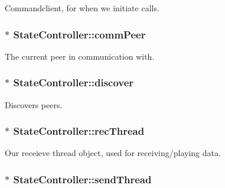\-Commandclient, for when we initiate calls. 

\hypertarget{class_state_controller_af5bd2961c916c50a04fdeaf9de4cc372}{
\subsubsection[{comm\-Peer}]{$\ast$ {\bf \-State\-Controller\-::comm\-Peer}}}
\label{class_state_controller_af5bd2961c916c50a04fdeaf9de4cc372}


\-The current peer in communication with. 

\hypertarget{class_state_controller_a5f4aa78836675a669da7c8a08d613af5}{
\subsubsection[{discover}]{$\ast$ {\bf \-State\-Controller\-::discover}}}
\label{class_state_controller_a5f4aa78836675a669da7c8a08d613af5}


\-Discovers peers. 

\hypertarget{class_state_controller_a21b3edaa3df30d5162650e0f0f296fe8}{
\subsubsection[{rec\-Thread}]{$\ast$ {\bf \-State\-Controller\-::rec\-Thread}}}
\label{class_state_controller_a21b3edaa3df30d5162650e0f0f296fe8}


\-Our receieve thread object, used for receiving/playing data. 

\hypertarget{class_state_controller_a27d6bac0bcc3c658bfcca57803c07fb1}{
\subsubsection[{send\-Thread}]{$\ast$ {\bf \-State\-Controller\-::send\-Thread}}}
\label{class_state_controller_a27d6bac0bcc3c658bfcca57803c07fb1}


